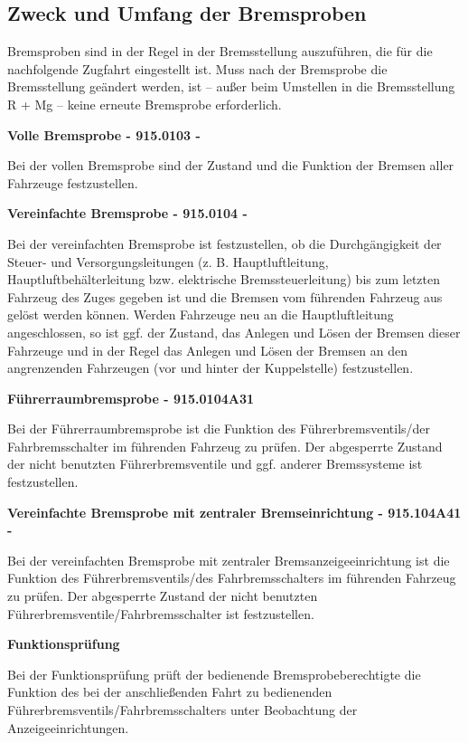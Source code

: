 \subsection{Zweck und Umfang der Bremsproben} 
Bremsproben sind in der Regel in der Bremsstellung auszuführen, die für die nachfolgende Zugfahrt eingestellt ist. Muss nach der Bremsprobe die Bremsstellung geändert werden, ist – außer beim Umstellen in die Bremsstellung R + Mg – keine erneute Bremsprobe erforderlich.\par
\textbf{Volle Bremsprobe - 915.0103 -} \par
Bei der vollen Bremsprobe sind der Zustand und die Funktion der Bremsen aller Fahrzeuge festzustellen.\par
\textbf{Vereinfachte Bremsprobe - 915.0104 -}\par
Bei der vereinfachten Bremsprobe ist festzustellen, ob die Durchgängigkeit der Steuer- und Versorgungsleitungen (z. B. Hauptluftleitung, Hauptluftbehälterleitung bzw. elektrische Bremssteuerleitung) bis zum letzten Fahrzeug des Zuges
gegeben ist und die Bremsen vom führenden Fahrzeug aus gelöst werden können. Werden Fahrzeuge neu an die Hauptluftleitung angeschlossen, so ist ggf. der Zustand, das Anlegen und Lösen der Bremsen dieser Fahrzeuge und in der Regel das Anlegen und Lösen der Bremsen an den angrenzenden Fahrzeugen (vor und hinter der Kuppelstelle) festzustellen.\par
\textbf{Führerraumbremsprobe - 915.0104A31}\par
Bei der Führerraumbremsprobe ist die Funktion des Führerbremsventils/der Fahrbremsschalter im führenden Fahrzeug zu prüfen. Der abgesperrte Zustand der nicht benutzten Führerbremsventile und ggf. anderer Bremssysteme ist festzustellen.\par
\textbf{Vereinfachte Bremsprobe mit zentraler Bremseinrichtung - 915.104A41 -}\par
Bei der vereinfachten Bremsprobe mit zentraler Bremsanzeigeeinrichtung ist die Funktion des Führerbremsventils/des Fahrbremsschalters im führenden Fahrzeug zu prüfen. Der abgesperrte Zustand der nicht benutzten Führerbremsventile/Fahrbremsschalter ist festzustellen.\par
\textbf{Funktionsprüfung}\par
Bei der Funktionsprüfung prüft der bedienende Bremsprobeberechtigte die Funktion des bei der anschließenden Fahrt zu bedienenden Führerbremsventils/Fahrbremsschalters unter Beobachtung der Anzeigeeinrichtungen.
